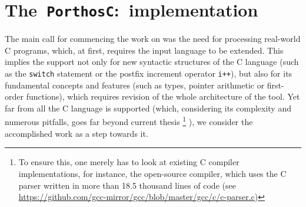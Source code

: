 \chapter{The~\texttt{PorthosC}:~implementation}
\label{ch:impl}

The main call for commencing the work on \porthos[2] was the need for processing real-world C programs, which, at first, requires the input language to be extended.
This implies the support not only for new syntactic structures of the C language (such as the \texttt{switch} statement or the postfix increment operator \texttt{i++}), but also for its fundamental concepts and features (such as types, pointer arithmetic or first-order functions), which requires revision of the whole architecture of the tool.
Yet far from all the C language is supported (which, considering its complexity and numerous pitfalls, goes far beyond current thesis%
%
\footnote{To ensure this, one merely has to look at existing C compiler implementations, for instance, the open-source  compiler, which uses the C parser written in more than 18.5 thousand lines of code (see \url{https://github.com/gcc-mirror/gcc/blob/master/gcc/c/c-parser.c})}%
%
), we consider the accomplished work as a step towards it.





